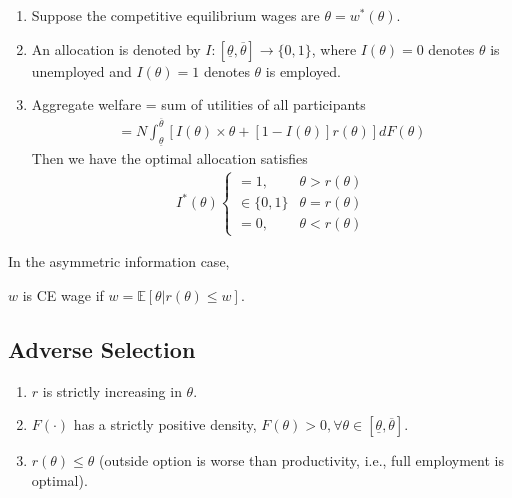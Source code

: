 \documentclass[11pt]{elegantbook_2}
\begin{document}
\begin{enumerate}[$\circ$]
    \item Suppose the competitive equilibrium wages are $\theta=w^*(\theta)$.
    \item An allocation is denoted by $I:\left[\underline{\theta},\overline{\theta}\right] \rightarrow \{0,1\}$, where $I(\theta)=0$ denotes $\theta$ is unemployed and $I(\theta)=1$ denotes $\theta$ is employed.
    \item Aggregate welfare = sum of utilities of all participants
    \begin{equation}
        \begin{aligned}
            =N\int_{\underline{\theta}}^{\overline{\theta}} \left[I(\theta)\times\theta+[1-I(\theta)]r(\theta)\right]dF(\theta)
        \end{aligned}
        \nonumber
    \end{equation}
    Then we have the optimal allocation satisfies
    \begin{equation}
        \begin{aligned}
            I^*(\theta)\left\{\begin{matrix}
                =1,&\theta>r(\theta)\\
                \in\{0,1\}&\theta=r(\theta)\\
                =0,&\theta<r(\theta)
            \end{matrix}\right.
        \end{aligned}
        \nonumber
    \end{equation}
\end{enumerate}
In the asymmetric information case,
\begin{definition}
$w$ is CE wage if $w=\mathbb{E}[\theta|r(\theta)\leq w]$.
\end{definition}

\subsection{Adverse Selection}
\begin{assumption}
    \begin{enumerate}[({A}1).]
        \item $r$ is strictly increasing in $\theta$.
        \item $F(\cdot)$ has a strictly positive density, $F(\theta)>0, \forall \theta\in \left[\underline{\theta},\overline{\theta}\right]$.
        \item $r(\theta)\leq\theta$ (outside option is worse than productivity, i.e., full employment is optimal).
    \end{enumerate}
\end{assumption}
\end{document}
